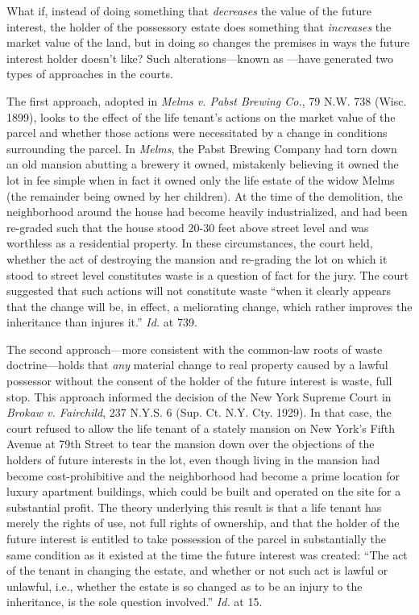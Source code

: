 
What if, instead of doing something that \textit{decreases} the value of the
future interest, the holder of the possessory estate does something that
\textit{increases} the market value of the land, but in doing so changes the
premises in ways the future interest holder doesn't like? Such
alterations---known as ---have generated two types
of approaches in the courts.

The first approach, adopted in \textit{Melms v. Pabst Brewing Co.}, 79 N.W. 738
(Wisc. 1899), looks to the effect of the life tenant's actions on the market
value of the parcel and whether those actions were necessitated by a change in
conditions surrounding the parcel. In \textit{Melms}, the Pabst Brewing Company
had torn down an old mansion abutting a brewery it owned, mistakenly believing
it owned the lot in fee simple when in fact it owned only the life estate of
the widow Melms (the remainder being owned by her children). At the time of the
demolition, the neighborhood around the house had become heavily
industrialized, and had been re-graded such that the house stood 20-30 feet
above street level and was worthless as a residential property. In these
circumstances, the court held, whether the act of destroying the mansion and
re-grading the lot on which it stood to street level constitutes waste is a
question of fact for the jury. The court suggested that such actions will not
constitute waste ``when it clearly appears that the change will be, in effect,
a meliorating change, which rather improves the inheritance than injures it.''
\textit{Id.} at 739.

The second approach---more consistent with the common-law roots of waste
doctrine---holds that \textit{any} material change to real property caused by a
lawful possessor without the consent of the holder of the future interest is
waste, full stop. This approach informed the decision of the New York Supreme
Court in \textit{Brokaw v. Fairchild}, 237 N.Y.S. 6 (Sup. Ct. N.Y. Cty. 1929).
In that case, the court refused to allow the life tenant of a stately mansion
on New York's Fifth Avenue at 79th Street to tear the mansion
down over the objections of the holders of future interests in the lot, even
though living in the mansion had become cost-prohibitive and the neighborhood
had become a prime location for luxury apartment buildings, which could be
built and operated on the site for a substantial profit. The theory underlying
this result is that a life tenant has merely the rights of use, not full rights
of ownership, and that the holder of the future interest is entitled to take
possession of the parcel in substantially the same condition as it existed at
the time the future interest was created: ``The act of the tenant in changing
the estate, and whether or not such act is lawful or unlawful, i.e., whether
the estate is so changed as to be an injury to the inheritance, is the sole
question involved.'' \textit{Id.} at 15.

